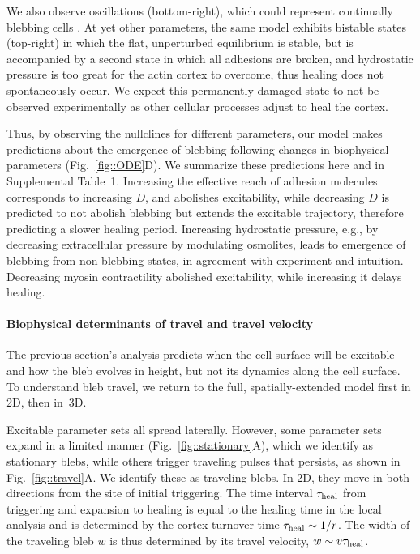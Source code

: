We also observe oscillations (bottom-right), which could represent continually blebbing cells \cite{Charras:2008ic}. At yet other parameters, the same model exhibits bistable states (top-right) in which the flat, unperturbed equilibrium is stable, but is accompanied by a second state in which all adhesions are broken, and hydrostatic pressure is too great for the actin cortex to overcome, thus healing does not spontaneously occur. We expect this permanently-damaged state to not be observed experimentally as other cellular processes adjust to heal the cortex.  

Thus, by observing the nullclines  for different parameters, our model makes predictions about the emergence of blebbing following changes in biophysical parameters (Fig.~\ref{fig::ODE}D). We summarize these predictions here and in {Supplemental Table~1}. Increasing the effective reach of adhesion molecules corresponds to increasing $D$, and abolishes excitability, while decreasing $D$ is predicted to not abolish blebbing but extends the excitable trajectory, therefore predicting a slower healing period. Increasing hydrostatic pressure, e.g., by decreasing extracellular pressure by modulating osmolites, leads to emergence of blebbing from non-blebbing states, in agreement with experiment \cite{Tinevez:2009bh} and intuition. Decreasing myosin contractility abolished excitability, while increasing it delays healing. 


\paragraph{Biophysical determinants of travel and travel velocity}

The previous section's analysis predicts when the cell surface will be excitable and how the bleb evolves in height, but not its dynamics along the cell surface. To understand bleb travel, we return to the full, spatially-extended model first in 2D, then in~3D. 

Excitable parameter sets all spread laterally. However, some parameter sets expand in a limited manner (Fig.~\ref{fig::stationary}A), which we identify as stationary blebs, while others trigger traveling pulses that persists, as shown in Fig.~\ref{fig::travel}A. We identify these as traveling blebs. In 2D, they move in both directions from the site of initial triggering. The time interval $\tau_{\mbox{\scriptsize heal}}$ from triggering and expansion to healing is equal to the healing time in the local analysis and is determined by the cortex turnover time $\tau_{\mbox{\scriptsize heal}} \sim 1/r$. The width of the traveling bleb $w$ is thus determined by its travel velocity, $w\sim v\tau_{\mbox{\scriptsize heal}}$. 


